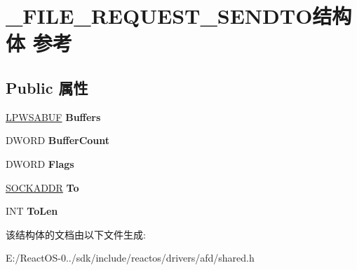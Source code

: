 \hypertarget{struct___f_i_l_e___r_e_q_u_e_s_t___s_e_n_d_t_o}{}\section{\+\_\+\+F\+I\+L\+E\+\_\+\+R\+E\+Q\+U\+E\+S\+T\+\_\+\+S\+E\+N\+D\+T\+O结构体 参考}
\label{struct___f_i_l_e___r_e_q_u_e_s_t___s_e_n_d_t_o}
\subsection*{Public 属性}
\begin{DoxyCompactItemize}
\item 
\mbox{\label{struct___f_i_l_e___r_e_q_u_e_s_t___s_e_n_d_t_o_ac867f4f923d55ea7eff645119970ac30}} 
\hyperlink{struct___w_s_a_b_u_f}{L\+P\+W\+S\+A\+B\+UF} {\bfseries Buffers}
\item 
\mbox{\label{struct___f_i_l_e___r_e_q_u_e_s_t___s_e_n_d_t_o_a7d2bf1087d2d96274eca10f3331364d7}} 
D\+W\+O\+RD {\bfseries Buffer\+Count}
\item 
\mbox{\label{struct___f_i_l_e___r_e_q_u_e_s_t___s_e_n_d_t_o_a5175e71e84012b9b11c153060aeafe8f}} 
D\+W\+O\+RD {\bfseries Flags}
\item 
\mbox{\label{struct___f_i_l_e___r_e_q_u_e_s_t___s_e_n_d_t_o_add492ef431cd63f81a77cfd00da08948}} 
\hyperlink{structsockaddr}{S\+O\+C\+K\+A\+D\+DR} {\bfseries To}
\item 
\mbox{\label{struct___f_i_l_e___r_e_q_u_e_s_t___s_e_n_d_t_o_a9c0c7fa53386edb3a24145b0e830f571}} 
I\+NT {\bfseries To\+Len}
\end{DoxyCompactItemize}


该结构体的文档由以下文件生成\+:\begin{DoxyCompactItemize}
\item 
E\+:/\+React\+O\+S-\/0../sdk/include/reactos/drivers/afd/shared.\+h\end{DoxyCompactItemize}
